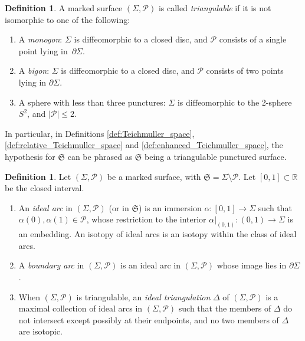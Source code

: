 \documentclass[10pt,a4paper]{amsart}
\numberwithin{equation}{section}
\theoremstyle{definition}
\newtheorem{Definition}[Theorem]{Definition}
\begin{document}
\begin{Definition}
\label{def:triangulable}
A marked surface $(\Sigma,\mathcal{P})$ is called {\em triangulable} if it is not isomorphic to one of the following:
\begin{enumerate}[label={\rm (\arabic*)}]\itemsep=0pt
\item A {\em monogon}: $\Sigma$ is diffeomorphic to a closed disc, and $\mathcal{P}$ consists of a single point lying in~$\partial \Sigma$.
\item A {\em bigon}: $\Sigma$ is diffeomorphic to a closed disc, and $\mathcal{P}$ consists of two points lying in $\partial \Sigma$.
\item A sphere with less than three punctures: $\Sigma$ is diffeomorphic to the 2-sphere $S^2$, and $|\mathcal{P}|\le 2$.
\end{enumerate}
\end{Definition}
In particular, in Definitions \ref{def:Teichmuller_space}, \ref{def:relative_Teichmuller_space} and \ref{def:enhanced_Teichmuller_space}, the hypothesis for $\mathfrak{S}$ can be phrased as $\mathfrak{S}$ being a triangulable punctured surface.
\begin{Definition}
\label{def:ideal_triangulation}
Let $(\Sigma,\mathcal{P})$ be a marked surface, with $\mathfrak{S} = \Sigma \setminus \mathcal{P}$. Let $[0,1] \subset \mathbb{R}$ be the closed interval.
\begin{enumerate}[label={\rm (\arabic*)}]\itemsep=0pt
\item An {\em ideal arc} in $(\Sigma,\mathcal{P})$ (or in $\mathfrak{S}$) is an immersion $\alpha \colon [0,1] \to \Sigma$ such that $\alpha(0),\alpha(1) \in \mathcal{P}$, whose restriction to the interior $\alpha|_{(0,1)} \colon (0,1) \to \Sigma$ is an embedding. An isotopy of ideal arcs is an isotopy within the class of ideal arcs.
\item A {\em boundary arc} in $(\Sigma,\mathcal{P})$ is an ideal arc in $(\Sigma,\mathcal{P})$ whose image lies in $\partial \Sigma$.
\item When $(\Sigma,\mathcal{P})$ is triangulable, an {\em ideal triangulation} $\Delta$ of $(\Sigma,\mathcal{P})$ is a maximal collection of ideal arcs in $(\Sigma,\mathcal{P})$ such that the members of $\Delta$ do not intersect except possibly at their endpoints, and no two members of $\Delta$ are isotopic.
\end{enumerate}
\end{Definition}
\end{document}
